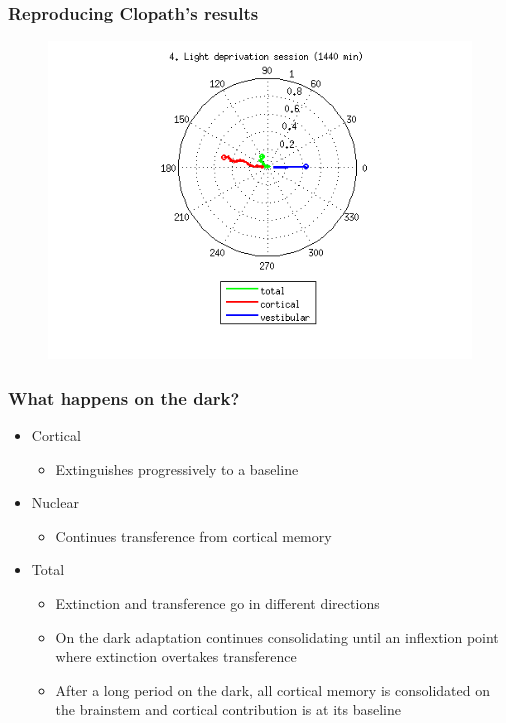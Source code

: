 \documentclass[10pt, compress]{beamer}
\begin{document}
\begin{frame}[fragile]
  \frametitle{Reproducing Clopath's results}
  \begin{figure}
    \includegraphics[scale=0.5]{images/longnoi_22.png}
  \end{figure}
\end{frame}

\begin{frame}[fragile]
  \frametitle{What happens on the dark?}
  \begin{itemize}
    \item Cortical
      \begin{itemize}
        \item Extinguishes progressively to a baseline
      \end{itemize}
    \item Nuclear
      \begin{itemize}
        \item Continues transference from cortical memory
      \end{itemize}
    \item Total
      \begin{itemize}
        \item Extinction and transference go in different directions
        \item On the dark adaptation continues consolidating until an inflextion point where extinction overtakes transference
        \item After a long period on the dark, all cortical memory is consolidated on the brainstem and cortical contribution is at its baseline
      \end{itemize}
  \end{itemize}
\end{frame}
\end{document}
